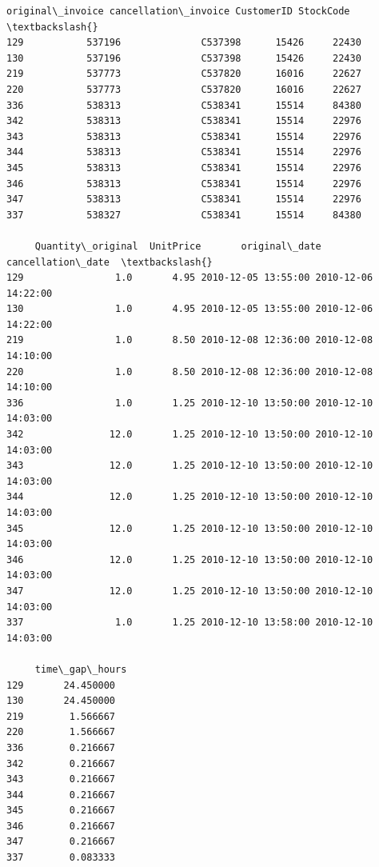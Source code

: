\documentclass[11pt]{article}
\begin{document}
    
    \begin{Verbatim}[commandchars=\\\{\}]
    original\_invoice cancellation\_invoice CustomerID StockCode  \textbackslash{}
129           537196              C537398      15426     22430   
130           537196              C537398      15426     22430   
219           537773              C537820      16016     22627   
220           537773              C537820      16016     22627   
336           538313              C538341      15514     84380   
342           538313              C538341      15514     22976   
343           538313              C538341      15514     22976   
344           538313              C538341      15514     22976   
345           538313              C538341      15514     22976   
346           538313              C538341      15514     22976   
347           538313              C538341      15514     22976   
337           538327              C538341      15514     84380   

     Quantity\_original  UnitPrice       original\_date   cancellation\_date  \textbackslash{}
129                1.0       4.95 2010-12-05 13:55:00 2010-12-06 14:22:00   
130                1.0       4.95 2010-12-05 13:55:00 2010-12-06 14:22:00   
219                1.0       8.50 2010-12-08 12:36:00 2010-12-08 14:10:00   
220                1.0       8.50 2010-12-08 12:36:00 2010-12-08 14:10:00   
336                1.0       1.25 2010-12-10 13:50:00 2010-12-10 14:03:00   
342               12.0       1.25 2010-12-10 13:50:00 2010-12-10 14:03:00   
343               12.0       1.25 2010-12-10 13:50:00 2010-12-10 14:03:00   
344               12.0       1.25 2010-12-10 13:50:00 2010-12-10 14:03:00   
345               12.0       1.25 2010-12-10 13:50:00 2010-12-10 14:03:00   
346               12.0       1.25 2010-12-10 13:50:00 2010-12-10 14:03:00   
347               12.0       1.25 2010-12-10 13:50:00 2010-12-10 14:03:00   
337                1.0       1.25 2010-12-10 13:58:00 2010-12-10 14:03:00   

     time\_gap\_hours  
129       24.450000  
130       24.450000  
219        1.566667  
220        1.566667  
336        0.216667  
342        0.216667  
343        0.216667  
344        0.216667  
345        0.216667  
346        0.216667  
347        0.216667  
337        0.083333  
    \end{Verbatim}
\end{document}
